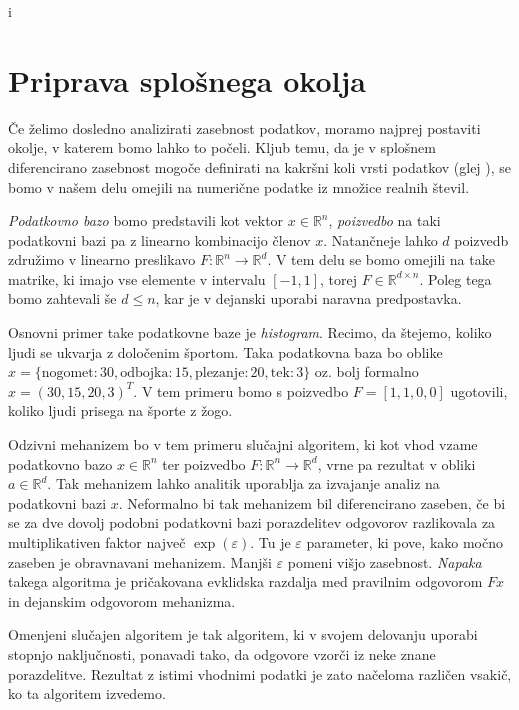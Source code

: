 i\documentclass[mat1]{fmfdelo}
\newcommand{\R}{\mathbb R}
\begin{document}
\section{Priprava splošnega okolja}

Če želimo dosledno analizirati zasebnost podatkov, moramo najprej postaviti okolje, v katerem bomo lahko to počeli. Kljub temu, da je v splošnem diferencirano zasebnost mogoče definirati na kakršni koli vrsti podatkov (glej \cite{metod}), se bomo v našem delu omejili na numerične podatke iz množice realnih števil.

{\em Podatkovno bazo} bomo predstavili kot vektor $x \in \R^n$, {\em poizvedbo} na taki podatkovni bazi pa z linearno kombinacijo členov $x$. Natančneje lahko $d$ poizvedb združimo v linearno preslikavo $F: \R^n \to \R^d$. V tem delu se bomo omejili na take matrike, ki imajo vse elemente v intervalu $[-1, 1]$, torej $F \in \R^{d \times n}$. Poleg tega bomo zahtevali še $d \leq n$, kar je v dejanski uporabi naravna predpostavka.

\begin{primer}
        Osnovni primer take podatkovne baze je {\em histogram}. Recimo, da štejemo, koliko ljudi se ukvarja z določenim športom. Taka podatkovna baza bo oblike $x = \{ \textrm{nogomet} : 30, \textrm{odbojka} : 15, \textrm{plezanje} : 20, \textrm{tek} : 3\}$ oz. bolj formalno $x = (30, 15, 20, 3)^T$. V tem primeru bomo s poizvedbo $F = [1, 1, 0, 0]$ ugotovili, koliko ljudi prisega na športe z žogo.
\end{primer}

Odzivni mehanizem bo v tem primeru slučajni algoritem, ki kot vhod vzame podatkovno bazo $x \in \R^n$ ter poizvedbo $F: \R^n \to \R^d$, vrne pa rezultat v obliki $a \in \R^d$. Tak mehanizem lahko analitik uporablja za izvajanje analiz na podatkovni bazi $x$. Neformalno bi tak mehanizem bil diferencirano zaseben, če bi se za dve dovolj podobni podatkovni bazi porazdelitev odgovorov razlikovala za multiplikativen faktor največ $\exp(\varepsilon)$. Tu je $\varepsilon$ parameter, ki pove, kako močno zaseben je obravnavani mehanizem. Manjši $\varepsilon$ pomeni višjo zasebnost. {\em Napaka} takega algoritma je pričakovana evklidska razdalja med pravilnim odgovorom $Fx$ in dejanskim odgovorom mehanizma.

Omenjeni slučajen algoritem je tak algoritem, ki v svojem delovanju uporabi stopnjo naključnosti, ponavadi tako, da odgovore vzorči iz neke znane porazdelitve. Rezultat z istimi vhodnimi podatki je zato načeloma različen vsakič, ko ta algoritem izvedemo.
\end{document}
